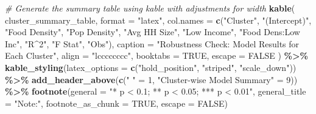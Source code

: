 \documentclass[
]{article}
\newenvironment{Shaded}{\begin{snugshade}}{\end{snugshade}}
\newcommand{\AttributeTok}[1]{\textcolor[rgb]{0.13,0.29,0.53}{#1}}
\newcommand{\CommentTok}[1]{\textcolor[rgb]{0.56,0.35,0.01}{\textit{#1}}}
\newcommand{\ConstantTok}[1]{\textcolor[rgb]{0.56,0.35,0.01}{#1}}
\newcommand{\DecValTok}[1]{\textcolor[rgb]{0.00,0.00,0.81}{#1}}
\newcommand{\FunctionTok}[1]{\textcolor[rgb]{0.13,0.29,0.53}{\textbf{#1}}}
\newcommand{\NormalTok}[1]{#1}
\newcommand{\OtherTok}[1]{\textcolor[rgb]{0.56,0.35,0.01}{#1}}
\newcommand{\SpecialCharTok}[1]{\textcolor[rgb]{0.81,0.36,0.00}{\textbf{#1}}}
\newcommand{\StringTok}[1]{\textcolor[rgb]{0.31,0.60,0.02}{#1}}
\begin{document}
\begin{Shaded}
\begin{Highlighting}[]
\CommentTok{\# Generate the summary table using kable with adjustments for width}
\FunctionTok{kable}\NormalTok{(}
\NormalTok{  cluster\_summary\_table,}
  \AttributeTok{format =} \StringTok{"latex"}\NormalTok{,}
  \AttributeTok{col.names =} \FunctionTok{c}\NormalTok{(}\StringTok{"Cluster"}\NormalTok{, }\StringTok{"(Intercept)"}\NormalTok{, }\StringTok{"Food Density"}\NormalTok{, }\StringTok{"Pop Density"}\NormalTok{, }
                \StringTok{"Avg HH Size"}\NormalTok{, }\StringTok{"Low Income"}\NormalTok{, }\StringTok{"Food Dens:Low Inc"}\NormalTok{,}
                \StringTok{"R\^{}2"}\NormalTok{, }\StringTok{"F Stat"}\NormalTok{, }\StringTok{"Obs"}\NormalTok{),}
  \AttributeTok{caption =} \StringTok{"Robustness Check: Model Results for Each Cluster"}\NormalTok{,}
  \AttributeTok{align =} \StringTok{"lcccccccc"}\NormalTok{,}
  \AttributeTok{booktabs =} \ConstantTok{TRUE}\NormalTok{,}
  \AttributeTok{escape =} \ConstantTok{FALSE}
\NormalTok{) }\SpecialCharTok{\%\textgreater{}\%}
  \FunctionTok{kable\_styling}\NormalTok{(}\AttributeTok{latex\_options =} \FunctionTok{c}\NormalTok{(}\StringTok{"hold\_position"}\NormalTok{, }\StringTok{"striped"}\NormalTok{, }\StringTok{"scale\_down"}\NormalTok{)) }\SpecialCharTok{\%\textgreater{}\%}
  \FunctionTok{add\_header\_above}\NormalTok{(}\FunctionTok{c}\NormalTok{(}\StringTok{" "} \OtherTok{=} \DecValTok{1}\NormalTok{, }\StringTok{"Cluster{-}wise Model Summary"} \OtherTok{=} \DecValTok{9}\NormalTok{)) }\SpecialCharTok{\%\textgreater{}\%}
  \FunctionTok{footnote}\NormalTok{(}\AttributeTok{general =} \StringTok{"* p \textless{} 0.1; ** p \textless{} 0.05; *** p \textless{} 0.01"}\NormalTok{, }
           \AttributeTok{general\_title =} \StringTok{"Note:"}\NormalTok{, }
           \AttributeTok{footnote\_as\_chunk =} \ConstantTok{TRUE}\NormalTok{, }
           \AttributeTok{escape =} \ConstantTok{FALSE}\NormalTok{)}
\end{Highlighting}
\end{Shaded}
\end{document}
